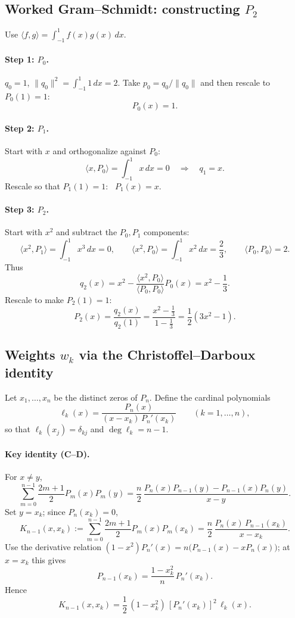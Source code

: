 \documentclass[12pt,a4paper]{article}
\theoremstyle{plain}
\theoremstyle{definition}
\theoremstyle{remark}
\theoremstyle{remark}
\begin{document}
\subsection*{Worked Gram--Schmidt: constructing $P_2$}

Use $\langle f,g\rangle=\int_{-1}^{1} f(x)g(x)\,dx$.

\paragraph{Step 1: $P_0$.}
$q_0=1$, $\|q_0\|^2=\int_{-1}^{1}1\,dx=2$. Take $p_0=q_0/\|q_0\|$ and then rescale to $P_0(1)=1$:
\[
P_0(x)=1.
\]

\paragraph{Step 2: $P_1$.}
Start with $x$ and orthogonalize against $P_0$:
\[
\langle x,P_0\rangle=\int_{-1}^{1} x\,dx=0 \quad\Rightarrow\quad q_1=x.
\]
Rescale so that $P_1(1)=1$: \ $P_1(x)=x$.

\paragraph{Step 3: $P_2$.}
Start with $x^2$ and subtract the $P_0,P_1$ components:
\[
\langle x^2,P_1\rangle=\int_{-1}^{1} x^3\,dx=0,\qquad
\langle x^2,P_0\rangle=\int_{-1}^{1} x^2\,dx=\frac{2}{3},\qquad
\langle P_0,P_0\rangle=2.
\]
Thus
\[
q_2(x)=x^2-\frac{\langle x^2,P_0\rangle}{\langle P_0,P_0\rangle}P_0(x)
=x^2-\frac{1}{3}.
\]
Rescale to make $P_2(1)=1$:
\[
P_2(x)=\frac{q_2(x)}{q_2(1)}
=\frac{x^2-\tfrac13}{1-\tfrac13}
=\frac12(3x^2-1).
\]

\subsection*{Weights $w_k$ via the Christoffel--Darboux identity}

Let $x_1,\dots,x_n$ be the distinct zeros of $P_n$. Define the cardinal polynomials
\[
\ell_k(x)=\frac{P_n(x)}{(x-x_k)\,P_n'(x_k)}\qquad (k=1,\dots,n),
\]
so that $\ell_k(x_j)=\delta_{kj}$ and $\deg \ell_k=n-1$.

\paragraph{Key identity (C--D).}
For $x\neq y$,
\[
\sum_{m=0}^{n-1}\frac{2m+1}{2}P_m(x)P_m(y)
=\frac{n}{2}\,\frac{P_n(x)P_{n-1}(y)-P_{n-1}(x)P_n(y)}{x-y}.
\]
Set $y=x_k$; since $P_n(x_k)=0$,
\[
K_{n-1}(x,x_k):=\sum_{m=0}^{n-1}\frac{2m+1}{2}P_m(x)P_m(x_k)
=\frac{n}{2}\,\frac{P_n(x)\,P_{n-1}(x_k)}{x-x_k}.
\]
Use the derivative relation $(1-x^2)P_n'(x)=n\big(P_{n-1}(x)-xP_n(x)\big)$; at $x=x_k$ this gives
\[
P_{n-1}(x_k)=\frac{1-x_k^2}{n}\,P_n'(x_k).
\]
Hence
\[
K_{n-1}(x,x_k)=\frac{1}{2}\,(1-x_k^2)\,[P_n'(x_k)]^2\,\ell_k(x).
\]
\end{document}
